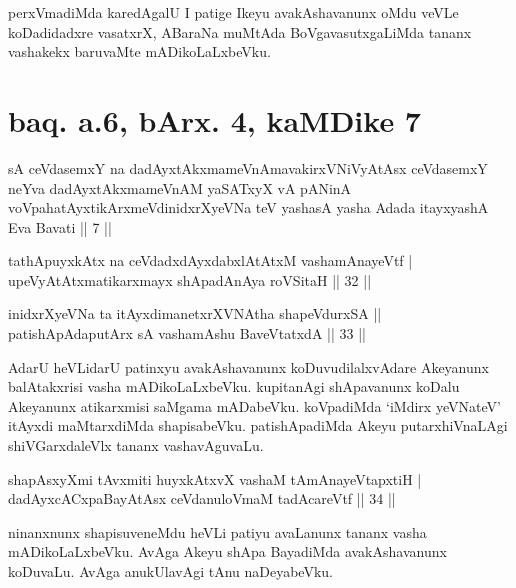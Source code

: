 \begin{artha}
perxVmadiMda karedAgalU I patige Ikeyu avakAshavanunx oMdu veVLe 
koDadidadxre vasatxrX, ABaraNa muMtAda BoVgavasutxgaLiMda tananx 
vashakekx baruvaMte mADikoLaLxbeVku.
\end{artha}

\section*{baq. a.6, bArx. 4, kaMDike 7}

\begin{shl}
sA ceVdasemxY na dadAyxtAkxmameVnAmavakirxVNiVyAtAsx ceVdasemxY neYva dadAyxtAkxmameVnAM yaSATxyX vA pANinA voVpahatAyxtikArxmeVdinidxrXyeVNa teV yashasA yasha Adada itayxyashA Eva Bavati || 7 ||
\end{shl}

\begin{shl}
tathA\s puyxkAtx na ceVdadxdAyxdabxlAtAtxM vashamAnayeVtf | \\
upeVyAtAtxmatikarxmayx shApadAnAya roVSitaH \hfill|| 32 || 
\end{shl}

\begin{shl}
inidxrXyeVNa ta itAyxdimanetxrXVNAtha shapeVdurxSA || \\
patishApAdaputArx sA vashamAshu BaveVtatxdA \hfill|| 33 || 
\end{shl}

\begin{artha}
AdarU heVLidarU patinxyu avakAshavanunx koDuvudilalxvAdare Akeyanunx 
balAtakxrisi vasha mADikoLaLxbeVku. kupitanAgi shApavanunx koDalu 
Akeyanunx atikarxmisi saMgama mADabeVku. koVpadiMda `iMdirx yeVNateV' itAyxdi 
maMtarxdiMda shapisabeVku. patishApadiMda Akeyu putarxhiVnaLAgi 
shiVGarxdaleVlx tananx vashavAguvaLu.
\end{artha}

\begin{shl}
shapAsxyXmi tAvxmiti huyxkAtxvX vashaM tAmAnayeVtapxtiH | \\
dadAyxcACxpaBayAtAsx ceVdanuloVmaM tadA\s \s careVtf \hfill|| 34 || 
\end{shl}

\begin{artha}
ninanxnunx shapisuveneMdu heVLi patiyu avaLanunx tananx vasha 
mADikoLaLxbeVku. AvAga Akeyu shApa BayadiMda avakAshavanunx koDuvaLu. 
AvAga anukUlavAgi tAnu naDeyabeVku.
\end{artha}


